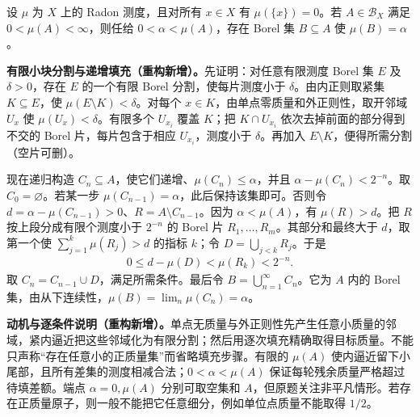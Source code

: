 \documentclass[../../main.tex]{subfiles}
\begin{document}
\begin{exercise}\label{exercise:ch07-atomless-prescribed-mass}
设 $\mu$ 为 $X$ 上的 Radon 测度，且对所有 $x\in X$ 有 $\mu(\{x\})=0$。若 $A\in\mathscr B_X$ 满足 $0<\mu(A)<\infty$，则任给 $0<\alpha<\mu(A)$，存在 Borel 集 $B\subseteq A$ 使 $\mu(B)=\alpha$。
\end{exercise}
\begin{solution}
\textbf{有限小块分割与递增填充（重构新增）。}先证明：对任意有限测度 Borel 集 $E$ 及 $\delta>0$，存在 $E$ 的一个有限 Borel 分割，使每片测度小于 $\delta$。由内正则取紧集 $K\subseteq E$，使 $\mu(E\setminus K)<\delta$。对每个 $x\in K$，由单点零质量和外正则性，取开邻域 $U_x$ 使 $\mu(U_x)<\delta$。有限多个 $U_{x_i}$ 覆盖 $K$；把 $K\cap U_{x_i}$ 依次去掉前面的部分得到不交的 Borel 片，每片包含于相应 $U_{x_i}$，测度小于 $\delta$。再加入 $E\setminus K$，便得所需分割（空片可删）。

现在递归构造 $C_n\subseteq A$，使它们递增、$\mu(C_n)\leqslant\alpha$，并且 $\alpha-\mu(C_n)<2^{-n}$。取 $C_0=\varnothing$。若某一步 $\mu(C_{n-1})=\alpha$，此后保持该集即可。否则令 $d=\alpha-\mu(C_{n-1})>0$、$R=A\setminus C_{n-1}$。因为 $\alpha<\mu(A)$，有 $\mu(R)>d$。把 $R$ 按上段分成有限个测度小于 $2^{-n}$ 的 Borel 片 $R_1,\ldots,R_m$。其部分和最终大于 $d$，取第一个使 $\sum_{j=1}^k\mu(R_j)>d$ 的指标 $k$；令 $D=\bigcup_{j<k}R_j$。于是
\begin{align*}
0\leqslant d-\mu(D)<\mu(R_k)<2^{-n}.
\end{align*}
取 $C_n=C_{n-1}\cup D$，满足所需条件。最后令 $B=\bigcup_{n=1}^\infty C_n$。它为 $A$ 内的 Borel 集，由从下连续性，$\mu(B)=\lim_n\mu(C_n)=\alpha$。
\end{solution}
\begin{remark}
\textbf{动机与逐条件说明（重构新增）。}单点无质量与外正则性先产生任意小质量的邻域，紧内逼近把这些邻域化为有限分割；然后用逐次填充精确取得目标质量。不能只声称“存在任意小的正质量集”而省略填充步骤。有限的 $\mu(A)$ 使内逼近留下小尾部，且所有差集的测度相减合法；$0<\alpha<\mu(A)$ 保证每轮残余质量严格超过待填差额。端点 $\alpha=0,\mu(A)$ 分别可取空集和 $A$，但原题关注非平凡情形。若存在正质量原子，则一般不能把它任意细分，例如单位点质量不能取得 $1/2$。
\end{remark}

\end{document}
